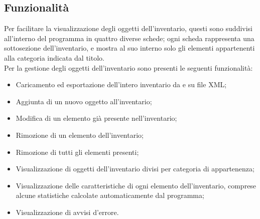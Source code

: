 \subsection{Funzionalità}
Per facilitare la visualizzazione degli oggetti dell'inventario, questi sono suddivisi all'interno del programma in quattro diverse schede; ogni scheda rappresenta una sottosezione dell'inventario, e mostra al suo interno solo gli elementi appartenenti alla categoria indicata dal titolo.\\
Per la gestione degli oggetti dell'inventario sono presenti le seguenti funzionalità:
\begin{itemize}
  \item Caricamento ed esportazione dell'intero inventario da e su file XML;
  \item Aggiunta di un nuovo oggetto all'inventario;
  \item Modifica di un elemento già presente nell'inventario;
  \item Rimozione di un elemento dell'inventario;
  \item Rimozione di tutti gli elementi presenti;
  \item Visualizzazione di oggetti dell'inventario divisi per categoria di appartenenza;
  \item Visualizzazione delle caratteristiche di ogni elemento dell'inventario, comprese alcune statistiche calcolate automaticamente dal programma;
  \item Visualizzazione di avvisi d'errore.
\end{itemize}
